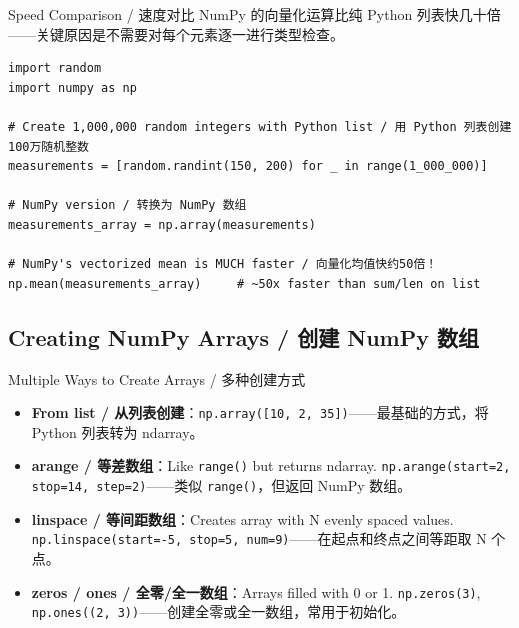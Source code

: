 \documentclass[11pt,a4paper]{report}
\let\oldtexttt\texttt
\renewcommand{\texttt}[1]{\textcolor{mainblue}{\oldtexttt{#1}}}
\begin{document}
\begin{examplebox}{Speed Comparison / 速度对比}
    NumPy 的向量化运算比纯 Python 列表快几十倍——关键原因是不需要对每个元素逐一进行类型检查。
\begin{lstlisting}
import random
import numpy as np

# Create 1,000,000 random integers with Python list / 用 Python 列表创建100万随机整数
measurements = [random.randint(150, 200) for _ in range(1_000_000)]

# NumPy version / 转换为 NumPy 数组
measurements_array = np.array(measurements)

# NumPy's vectorized mean is MUCH faster / 向量化均值快约50倍！
np.mean(measurements_array)     # ~50x faster than sum/len on list
\end{lstlisting}
\end{examplebox}

\subsection{Creating NumPy Arrays / 创建 NumPy 数组}

\begin{concept}{Multiple Ways to Create Arrays / 多种创建方式}
    \begin{itemize}[itemsep=0.5em]
        \item \textbf{From list / 从列表创建}：\texttt{np.array([10, 2, 35])}——最基础的方式，将 Python 列表转为 ndarray。
        \item \textbf{arange / 等差数组}：Like \texttt{range()} but returns ndarray. \texttt{np.arange(start=2, stop=14, step=2)}——类似 \texttt{range()}，但返回 NumPy 数组。
        \item \textbf{linspace / 等间距数组}：Creates array with N evenly spaced values. \texttt{np.linspace(start=-5, stop=5, num=9)}——在起点和终点之间等距取 N 个点。
        \item \textbf{zeros / ones / 全零/全一数组}：Arrays filled with 0 or 1. \texttt{np.zeros(3)}, \texttt{np.ones((2, 3))}——创建全零或全一数组，常用于初始化。
    \end{itemize}
\end{concept}
\end{document}
